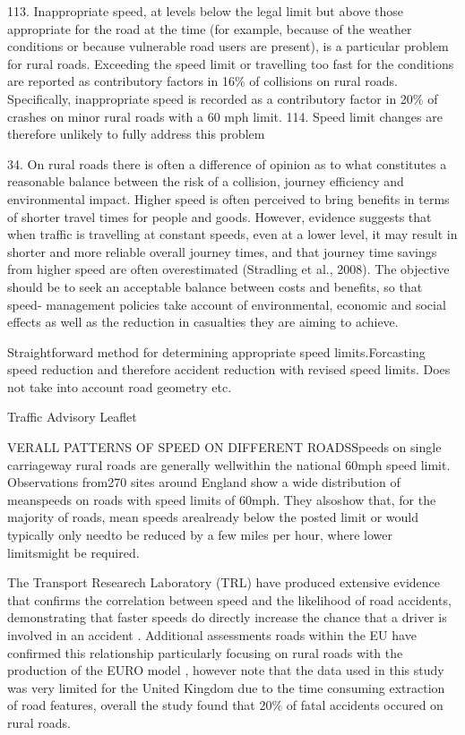 \begin{multicols}{2}
113. Inappropriate speed, at levels below the legal limit but above those
appropriate for the road at the time (for example, because of the weather
conditions or because vulnerable road users are present), is a particular
problem for rural roads. Exceeding the speed limit or travelling too fast for
the conditions are reported as contributory factors in 16\% of collisions on
rural roads. Specifically, inappropriate speed is recorded as a contributory
factor in 20\% of crashes on minor rural roads with a 60 mph limit.
114. Speed limit changes are therefore unlikely to fully address this problem


34. On rural roads there is often a difference of opinion as to what constitutes
a reasonable balance between the risk of a collision, journey efficiency
and environmental impact. Higher speed is often perceived to bring
benefits in terms of shorter travel times for people and goods. However,
evidence suggests that when traffic is travelling at constant speeds, even
at a lower level, it may result in shorter and more reliable overall journey
times, and that journey time savings from higher speed are often
overestimated (Stradling et al., 2008). The objective should be to seek an
acceptable balance between costs and benefits, so that speed-
management policies take account of environmental, economic and social
effects as well as the reduction in casualties they are aiming to achieve.

\citep{departmentfortransport2013a} Straightforward method for determining appropriate speed limits.Forcasting speed reduction and therefore accident reduction with revised speed limits. Does not take into account road geometry etc.

Traffic Advisory Leaflet

VERALL PATTERNS OF SPEED ON DIFFERENT ROADSSpeeds on single carriageway rural roads are generally wellwithin the national 60mph speed limit. Observations from270 sites around England show a wide distribution of meanspeeds on roads with speed limits of 60mph. They alsoshow that, for the majority of roads, mean speeds arealready below the posted limit or would typically only needto be reduced by a few miles per hour, where lower limitsmight be required.

    The Transport Researech Laboratory (TRL) have produced extensive evidence that confirms the correlation between speed and the likelihood of road accidents, demonstrating that faster speeds do directly increase the chance that a driver is involved in an accident \citep{taylor2002}. Additional assessments roads within the EU have confirmed this relationship particularly focusing on rural roads with the production of the EURO model \citep{baruya1998}, however \cite{taylor2002} note that the data used in this study was very limited for the United Kingdom due to the time consuming extraction of road features, overall the study found that 20\% of fatal accidents occured on rural roads.


\end{multicols}
